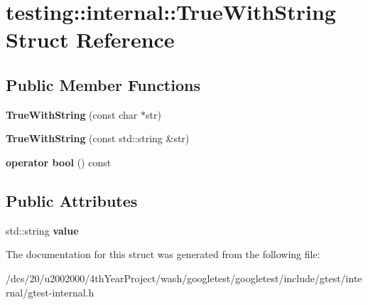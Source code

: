 \hypertarget{structtesting_1_1internal_1_1TrueWithString}{}\section{testing\+:\+:internal\+:\+:True\+With\+String Struct Reference}
\label{structtesting_1_1internal_1_1TrueWithString}
\subsection*{Public Member Functions}
\begin{DoxyCompactItemize}
\item 
\mbox{\label{structtesting_1_1internal_1_1TrueWithString_ab159d2859743c08d6644dbeea823292c}} 
{\bfseries True\+With\+String} (const char $\ast$str)
\item 
\mbox{\label{structtesting_1_1internal_1_1TrueWithString_a64fce0ccd077cbea8303bd617ce16a6c}} 
{\bfseries True\+With\+String} (const std\+::string \&str)
\item 
\mbox{\label{structtesting_1_1internal_1_1TrueWithString_a828677bf89b7128e6e1bf4195b6389b7}} 
{\bfseries operator bool} () const
\end{DoxyCompactItemize}
\subsection*{Public Attributes}
\begin{DoxyCompactItemize}
\item 
\mbox{\label{structtesting_1_1internal_1_1TrueWithString_a7db241041a849439fc92fa43c8adbd0a}} 
std\+::string {\bfseries value}
\end{DoxyCompactItemize}


The documentation for this struct was generated from the following file\+:\begin{DoxyCompactItemize}
\item 
/dcs/20/u2002000/4th\+Year\+Project/wash/googletest/googletest/include/gtest/internal/gtest-\/internal.\+h\end{DoxyCompactItemize}
